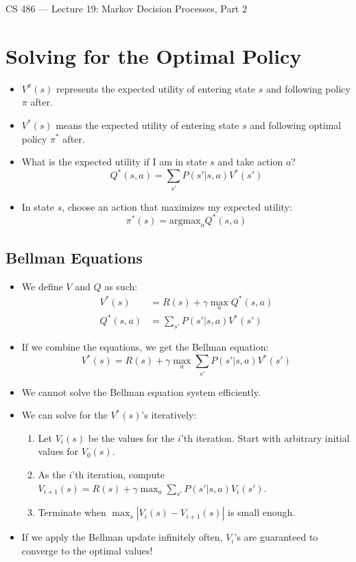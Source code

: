 \documentclass{article}
\author{Clement Tsang}
\begin{document}
\begin{center}
    \Large{CS 486 --- Lecture 19: Markov Decision Processes, Part 2}
\end{center}

\section{Solving for the Optimal Policy}
\begin{itemize}
    \item $V^{\pi}(s)$ represents the expected utility of entering state $s$ and following policy $\pi$ after.
    \item $V^*(s)$ means the expected utility of entering state $s$ and following optimal policy $\pi^*$ after.
    \item What is the expected utility if I am in state $s$ and take action $a$?
        \[
            Q^*(s, a) = \sum_{s'} P(s' | s, a) V^*(s')
        \]
    \item In state $s$, choose an action that maximizes my expected utility:
        \[
            \pi^*(s) = \text{argmax}_a Q^*(s, a)
        \]
\end{itemize}

\subsection{Bellman Equations}
\begin{itemize}
    \item We define $V$ and $Q$ as such:
        \begin{align*}
            V^*(s) &= R(s) + \gamma \max_a Q^*(s, a)\\
            Q^*(s, a) &= \sum_{s'} P(s' | s, a) V^*(s')
        \end{align*}
    \item If we combine the equations, we get the Bellman equation:
        \[
            V^*(s) = R(s) + \gamma \max_a \sum_{s'} P(s' | s,a) V^*(s')
        \]
    \item We cannot solve the Bellman equation system efficiently.
    \item We can solve for the $V^*(s)$'s iteratively:
        \begin{enumerate}
            \item Let $V_i(s)$ be the values for the $i$'th iteration.  Start with arbitrary initial values for $V_0(s)$.
            \item As the $i$'th iteration, compute $V_{i+1}(s) = R(s) + \gamma \max_a \sum_{s'} P(s' | s, a) V_i(s')$.
            \item Terminate when $\max_s|V_i(s) - V_{i+1}(s)|$ is small enough.
        \end{enumerate}
    \item If we apply the Bellman update infinitely often, $V_i$'s are guaranteed to converge to the optimal values!
\end{itemize}
\end{document}
